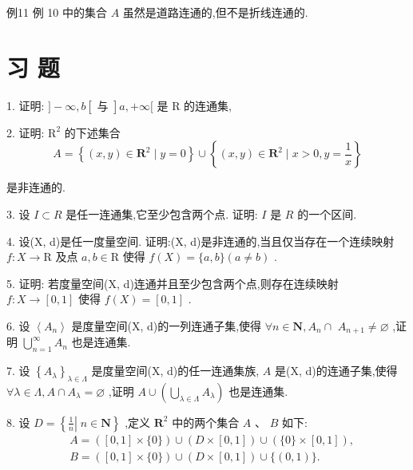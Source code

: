 例11 例 10 中的集合 $A$ 虽然是道路连通的,但不是折线连通的.

\section*{习 题}

1. 证明: $\rbrack  - \infty ,b\left\lbrack  \text{ 与 }\right\rbrack  a, + \infty \lbrack$ 是 $\mathrm{R}$ 的连通集,

2. 证明: ${\mathrm{R}}^{2}$ 的下述集合
$$A = \left\{  {\left( {x,y}\right)  \in  {\mathbf{R}}^{2} \mid  y = 0}\right\}   \cup  \left\{  {\left( {x,y}\right)  \in  {\mathbf{R}}^{2} \mid  x > 0,y = \frac{1}{x}}\right\}$$

是非连通的.

3. 设 $I \subset  R$ 是任一连通集,它至少包含两个点. 证明: $I$ 是 $R$ 的一个区间.

4. 设(X, d)是任一度量空间. 证明:(X, d)是非连通的,当且仅当存在一个连续映射 $f : X \rightarrow  \mathrm{R}$ 及点 $a,b \in  \mathrm{R}$ 使得 $f\left( X\right)  = \{ a,b\} \left( {a \neq  b}\right)$ .

5. 证明: 若度量空间(X, d)连通并且至少包含两个点,则存在连续映射 $f : X \rightarrow  \left\lbrack  {0,1}\right\rbrack$ 使得 $f\left( X\right)  = \left\lbrack  {0,1}\right\rbrack$ .

6. 设 $\left\langle  {A}_{n}\right\rangle$ 是度量空间(X, d)的一列连通子集,使得 $\forall n \in  \mathbf{N},{A}_{n} \cap$  ${A}_{n + 1} \neq  \varnothing$ ,证明 $\mathop{\bigcup }\limits_{{n = 1}}^{\infty }{A}_{n}$ 也是连通集.

7. 设 ${\left\{  {A}_{\lambda }\right\}  }_{\lambda  \in  \Lambda }$ 是度量空间(X, d)的任一连通集族, $A$ 是(X, d)的连通子集,使得 $\forall \lambda  \in  \Lambda ,A \cap  {A}_{\lambda } = \varnothing$ ,证明 $A \cup  \left( {\mathop{\bigcup }\limits_{{\lambda  \in  \Lambda }}{A}_{\lambda }}\right)$ 也是连通集.

8. 设 $D = \left\{  {\left. \frac{1}{n}\right| \;n \in  \mathbf{N}}\right\}$ ,定义 ${\mathbf{R}}^{2}$ 中的两个集合 $A$ 、 $B$ 如下:
\begin{align*}
	&A = \left( {\left\lbrack  {0,1}\right\rbrack  \times \{ 0\} }\right)  \cup  \left( {D \times  \left\lbrack  {0,1}\right\rbrack  }\right)  \cup  \left( {\{ 0\}  \times  \left\lbrack  {0,1}\right\rbrack  }\right) ,\\
	&B = \left( {\left\lbrack  {0,1}\right\rbrack  \times \{ 0\} }\right)  \cup  \left( {D \times  \left\lbrack  {0,1}\right\rbrack  }\right)  \cup  \{ \left( {0,1}\right) \} .
\end{align*}

